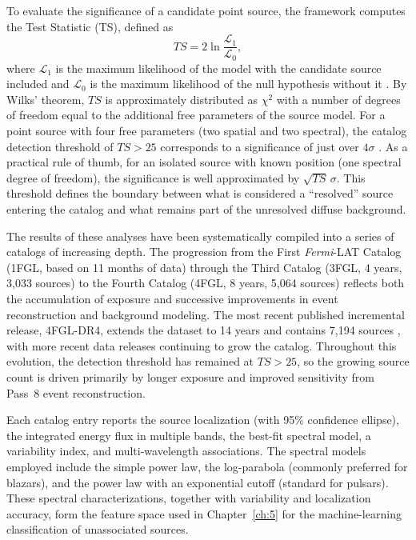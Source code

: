 To evaluate the significance of a candidate point source, the framework computes the Test Statistic (TS), defined as \[ TS = 2\ln\frac{\mathcal{L}_1}{\mathcal{L}_0}, \] where $\mathcal{L}_1$ is the maximum likelihood of the model with the candidate source included and $\mathcal{L}_0$ is the maximum likelihood of the null hypothesis without it \cite{Mattox:1996zz}.
By Wilks' theorem, $TS$ is approximately distributed as $\chi^2$ with a number of degrees of freedom equal to the additional free parameters of the source model.
For a point source with four free parameters (two spatial and two spectral), the catalog detection threshold of $TS > 25$ corresponds to a significance of just over $4\sigma$ \cite{Fermi-LAT:2015bhf,Fermi-LAT:2019yla}.
As a practical rule of thumb, for an isolated source with known position (one spectral degree of freedom), the significance is well approximated by $\sqrt{TS}\,\sigma$.
This threshold defines the boundary between what is considered a ``resolved'' source entering the catalog and what remains part of the unresolved diffuse background.

The results of these analyses have been systematically compiled into a series of catalogs of increasing depth.
The progression from the First \textit{Fermi}-LAT Catalog (1FGL, based on 11 months of data) through the Third Catalog (3FGL, 4 years, 3,033 sources) to the Fourth Catalog (4FGL, 8 years, 5,064 sources) \cite{Fermi-LAT:2015bhf,Fermi-LAT:2019yla} reflects both the accumulation of exposure and successive improvements in event reconstruction and background modeling.
The most recent published incremental release, 4FGL-DR4, extends the dataset to 14 years and contains 7,194 sources \cite{2023arXiv230712546B}, with more recent data releases continuing to grow the catalog.
Throughout this evolution, the detection threshold has remained at $TS > 25$, so the growing source count is driven primarily by longer exposure and improved sensitivity from Pass~8 event reconstruction.

Each catalog entry reports the source localization (with 95\% confidence ellipse), the integrated energy flux in multiple bands, the best-fit spectral model, a variability index, and multi-wavelength associations.
The spectral models employed include the simple power law, the log-parabola (commonly preferred for blazars), and the power law with an exponential cutoff (standard for pulsars).
These spectral characterizations, together with variability and localization accuracy, form the feature space used in Chapter~\ref{ch:5} for the machine-learning classification of unassociated sources.

